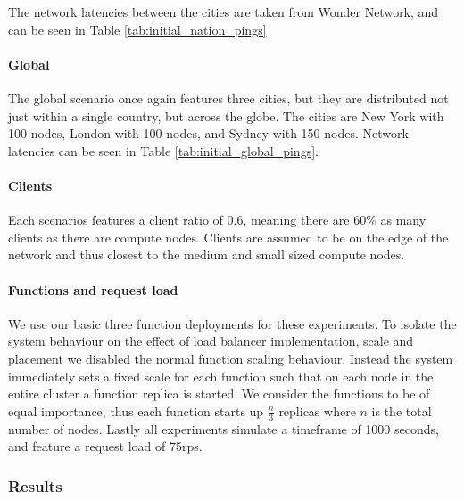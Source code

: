     

The network latencies between the cities are taken from Wonder Network\cite{wondernetworkGlobalPingStatistics}, and can be seen in Table \ref{tab:initial_nation_pings}

\paragraph{Global}
The global scenario once again features three cities, but they are distributed not just within a single country, but across the globe.
The cities are New York with 100 nodes, London with 100 nodes, and Sydney with 150 nodes.
Network latencies can be seen in Table \ref{tab:initial_global_pings}.

\paragraph{Clients}
Each scenarios features a client ratio of 0.6, meaning there are 60\% as many clients as there are compute nodes.
Clients are assumed to be on the edge of the network and thus closest to the medium and small sized compute nodes.

\paragraph{Functions and request load}
We use our basic three function deployments for these experiments.
To isolate the system behaviour on the effect of load balancer implementation, scale and placement we disabled the normal function scaling behaviour.
Instead the system immediately sets a fixed scale for each function such that on each node in the entire cluster a function replica is started.
We consider the functions to be of equal importance, thus each function starts up $\frac{n}{3}$ replicas where $n$ is the total number of nodes.
Lastly all experiments simulate a timeframe of 1000 seconds, and feature a request load of 75\gls{rps}.

\subsubsection{Results}



